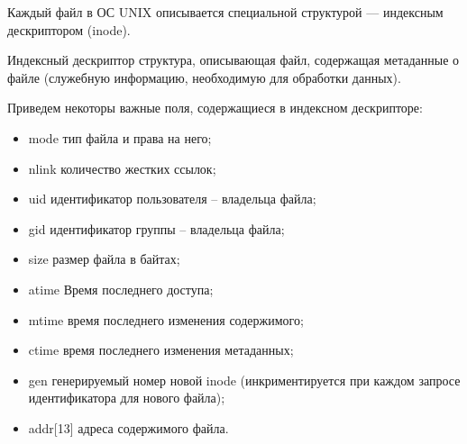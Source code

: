 Каждый файл в ОС UNIX описывается специальной структурой --- индексным дескриптором (inode). 

\begin{defi}{Индексный дескриптор}
	структура, описывающая файл, содержащая метаданные о файле (служебную информацию, необходимую для обработки данных).
\end{defi}

Приведем некоторы важные поля, содержащиеся в индексном дескрипторе:

\begin{itemize}
	\item \begin{defi}{mode}
		тип файла и права на него;
		\end{defi}

	\item \begin{defi}{nlink}
		количество жестких ссылок;
		\end{defi}

	\item \begin{defi}{uid}
		идентификатор пользователя -- владельца файла;
		\end{defi}

	\item \begin{defi}{gid}
		идентификатор группы -- владельца файла;
		\end{defi}

	\item \begin{defi}{size}
		размер файла в байтах;
		\end{defi}

	\item \begin{defi}{atime}
		Время последнего доступа;
		\end{defi}

	\item \begin{defi}{mtime}
		время последнего изменения содержимого;
		\end{defi}

	\item \begin{defi}{ctime}
		время последнего изменения метаданных;
		\end{defi}

	\item \begin{defi}{gen}
		генерируемый номер новой inode (инкриментируется при каждом запросе идентификатора для нового файла);
		\end{defi}

	\item \begin{defi}{addr[13]}
		адреса содержимого файла.
		\end{defi}
\end{itemize}

